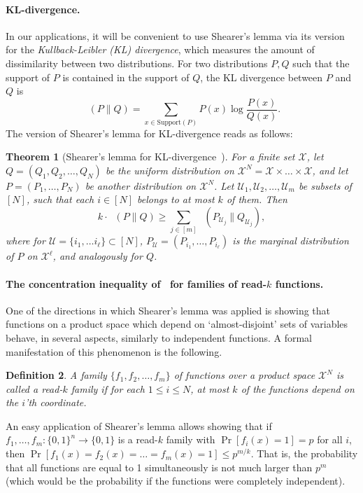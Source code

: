 \documentclass[11pt]{article}
\newtheorem{theorem}{Theorem}[section]
\newtheorem{definition}[theorem]{Definition}
\DeclareMathOperator{\KL}{D_{\text{KL}}}
\newcommand{\Qcal}{\mathcal{U}}
\begin{document}
\paragraph{KL-divergence.} In our applications, it will be convenient to use Shearer's lemma via its version for the \emph{Kullback-Leibler (KL) divergence}, which measures the amount of dissimilarity between two distributions. 
For two distributions $P,Q$ such that the support of $P$ is contained in the support of $Q$, the KL divergence between $P$ and $Q$ is
\[
\KL( P \| Q ) = \sum_{x \in \mathrm{Support}(P)} P(x) \log \frac{P(x)}{Q(x)}. 
\]
The version of Shearer's lemma for KL-divergence reads as follows:
\begin{theorem}[Shearer's lemma for KL-divergence~\cite{GavinskyLSS15}] 
\label{thm:shearer-KL}
For a finite set $\mathcal{X}$, let $Q=(Q_1,Q_2,\ldots,Q_N)$ be the uniform distribution on $\mathcal{X}^N = \mathcal{X} \times \ldots \times \mathcal{X}$, and let $P=(P_1,\ldots,P_N)$ be another distribution on $\mathcal{X}^N$. Let
$\Qcal_1,\Qcal_2,\ldots,\Qcal_m$ be subsets of $[N]$, such that each $i \in [N]$ belongs to at most $k$ of them. Then
$$k\cdot\KL( P \| Q ) \geq \sum_{j \in [m]} \KL( P_{\Qcal_j} \| Q_{\Qcal_j}),$$
where for $\Qcal =\{i_1,\dots i_\ell\} \subset [N]$, $P_{\Qcal}=(P_{i_1},\ldots,P_{i_\ell})$ is the marginal distribution of $P$ on $\mathcal{X}^{\ell}$, and analogously for $Q$. 
\end{theorem}

\paragraph{The concentration inequality of~\cite{GavinskyLSS15} for families of read-$k$ functions.} One of the directions in which Shearer's lemma was applied is showing that functions on a product space which depend on `almost-disjoint' sets of variables behave, in several aspects, similarly to independent functions. A formal manifestation of this phenomenon is the following. 
\begin{definition}
    A family $\{f_1,f_2,\ldots,f_m\}$ of functions over a product space $\mathcal{X}^N$ is called a \emph{read-$k$ family} if for each $1 \leq i \leq N$, at most $k$ of the functions depend on the $i$'th coordinate. 
\end{definition}
An easy application of Shearer's lemma allows showing that if $f_1,\ldots,f_m:\{0,1\}^n \to \{0,1\}$ is a read-$k$ family with $\Pr[f_i(x)=1]=p$ for all $i$, then $\Pr[f_1(x)=f_2(x)=\ldots=f_m(x)=1] \leq p^{m/k}$. That is, the probability that all functions are equal to 1 simultaneously is not much larger than $p^m$ (which would be the probability if the functions were completely independent). 
\end{document}
